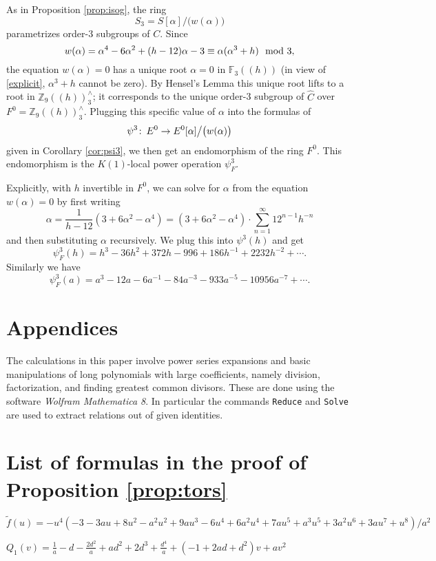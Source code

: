 \documentclass{gtpart}
\theoremstyle{definition}
\theoremstyle{remark}
\def\co{\colon\thinspace}
\newcommand{\mb}[1]{\mathbb{#1}}
\newcommand{\BF}{{\mb F}}
\newcommand{\BZ}{{\mb Z}}
\newcommand{\HC}{\widehat{C}}
\newcommand{\Tf}{\widetilde{f}}
\newcommand{\md}{~~{\rm mod}~}
\newcommand{\A}{\alpha}
\newcommand{\p}{\psi^3}
\begin{document}
As in Proposition \ref{prop:isog}, the ring 
\[
 S_3 = S[\A] \big/ \big( w(\A) \big) 
\]
parametrizes order-3 subgroups of $C$.  Since 
\[
 w(\A) = \A^4 - 6 \A^2 + (h - 12) \A - 3 \equiv \A (\A^3 + h) \md 3, 
\]
the equation $w(\A) = 0$ has a unique root $\A = 0$ in $\BF_3 (\!(h)\!)$ (in view of \eqref{explicit}, $\A^3 + h$ cannot be zero).  
By Hensel's Lemma this unique root lifts to a root in $\BZ_9 (\!(h)\!)_3^\wedge$; 
it corresponds to the unique order-3 subgroup of $\HC$ over $F^0 = \BZ_9 (\!(h)\!)_3^\wedge$.  
Plugging this specific value of $\A$ into the formulas of 
\[
 \p \co E^0 \to E^0 [\A] \big/ \big( w(\A) \big) 
\]
given in Corollary \ref{cor:psi3}, we then get an endomorphism of the ring $F^0$.  
This endomorphism is the $K(1)$-local power operation $\psi_F^3$.  

Explicitly, with $h$ invertible in $F^0$, we can solve for $\A$ from the equation $w(\A) = 0$ by first writing 
\[
 \A = \frac{1}{h - 12} (3 + 6 \A^2 - \A^4) = (3 + 6 \A^2 - \A^4) \cdot \sum_{n = 1}^\infty 12^{n-1} h^{-n} 
\]
and then substituting $\A$ recursively.  We plug this into $\p(h)$ and get 
\[
 \psi_F^3(h) = h^3 - 36 h^2 + 372 h - 996 + 186 h^{-1} + 2232 h^{-2} + \cdots.  
\]
Similarly we have 
\[
 \psi_F^3(a) = a^3 - 12 a - 6 a^{-1} - 84 a^{-3} - 933 a^{-5} - 10956 a^{-7} + \cdots.  
\]


\appendix
\section*{Appendices}

The calculations in this paper involve power series expansions and basic manipulations of long polynomials with large coefficients, 
namely division, factorization, and finding greatest common divisors.  
These are done using the software {\em Wolfram Mathematica 8}.  
In particular the commands \texttt{Reduce} and \texttt{Solve} are used to extract relations out of given identities.


\section{List of formulas in the proof of Proposition \ref{prop:tors}}
\label{apx:tors}

$\Tf(u) = -u^4 (-3 - 3 a u + 8 u^2 - a^2 u^2 + 9 a u^3 - 6 u^4 + 6 a^2 u^4 + 
    7 a u^5 + a^3 u^5 + 3 a^2 u^6 + 3 a u^7 + u^8) / a^2$

$Q_1(v) = \frac{1}{a} - d - \frac{2 d^2}{a} + a d^2 + 2 d^3 + \frac{d^4}{a} + (-1 + 2 a d + d^2) v + 
 a v^2$
\end{document}
